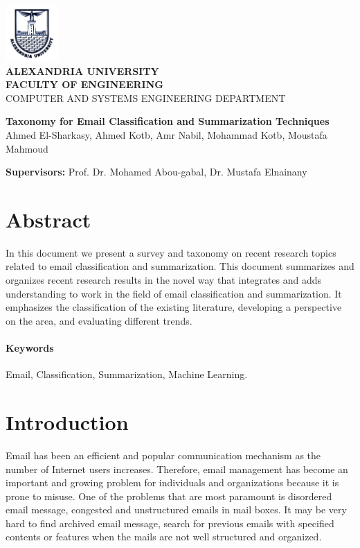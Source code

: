 \documentclass[12pt]{article}
\begin{document}
\begin{titlepage}
\vspace{-1.5cm}
\begin{center}
\includegraphics[width=2cm]{Logo_Alexandria_University.jpg}\\
\vspace{1cm}
\textbf{\large ALEXANDRIA UNIVERSITY} \\
\textbf{FACULTY OF ENGINEERING} \\
{\small  COMPUTER AND SYSTEMS ENGINEERING DEPARTMENT}

\vspace{2.5cm}
\textbf{\LARGE Taxonomy for Email Classification and Summarization Techniques}\\
\vspace{1cm}
{ Ahmed El-Sharkasy, Ahmed Kotb, Amr Nabil, Mohammad Kotb, Moustafa Mahmoud }
\end{center}

\vspace{1ex}
\textbf{Supervisors:} Prof. Dr. Mohamed Abou-gabal, Dr. Mustafa Elnainany
\end{titlepage}

\newpage
\tableofcontents
\newpage

\section{Abstract}
In this document we present a survey and taxonomy on recent research topics 
related to email classification and summarization. This document summarizes 
and organizes recent research results in the novel way that integrates and 
adds understanding to work in the field of email classification and 
summarization. It emphasizes the classification of the existing literature, 
developing a perspective on the area, and evaluating different trends.

\paragraph{Keywords}
Email, Classification, Summarization, Machine Learning.

\section{Introduction}
Email has been an efficient and popular communication mechanism as the 
number of Internet users increases. Therefore, email management has become 
an important and growing problem for individuals and organizations because 
it is prone to misuse. One of the problems that are most paramount is disordered 
email message, congested and unstructured emails in mail boxes. It may be very 
hard to find archived email message, search for previous emails with specified 
contents or features when the mails are not well structured and organized.
\end{document}
